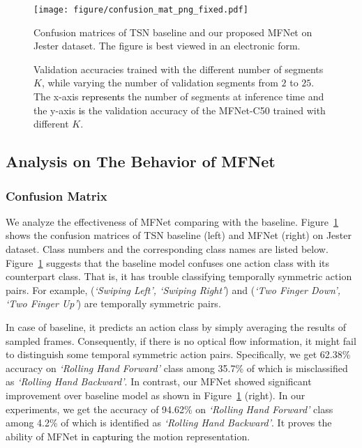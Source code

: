 \documentclass[runningheads]{llncs}
\newcommand{\nj}[1]{\textcolor{black}{#1}}
\begin{document}
\begin{figure}[t]
\centering
\texttt{[image: figure/confusion\_mat\_png\_fixed.pdf]}
\caption{Confusion matrices of TSN baseline and our proposed MFNet on Jester dataset. The figure is best viewed in an electronic form.} 
\label{confusion}
\end{figure}


\begin{figure}[tb]
\centering
\begin{minipage}[t]{0.45\linewidth}
    \label{f3}
\end{minipage}
\begin{minipage}[t]{0.45\linewidth}
    \label{f4}
\end{minipage}
\caption{Validation accuracies trained with the different number of segments $K$, while varying the number of validation segments from $2$ to $25$. The x-axis \nj{represents} the number of segments at inference time and the y-axis \nj{is} the validation accuracy of the MFNet-C50 trained with different $K$.}
\label{figure:varying_inference}
\end{figure}

\subsection{Analysis on The Behavior of MFNet}
\subsubsection{Confusion Matrix}
We analyze the effectiveness of MFNet comparing with the baseline. Figure~\ref{confusion} shows the confusion matrices of TSN baseline (left) and MFNet (right) on Jester dataset. Class numbers and the corresponding class names are listed below. Figure~\ref{confusion} suggests that the baseline model confuses one action class with its counterpart class. That is, it has trouble classifying temporally symmetric action pairs. For example, (\textit{`Swiping Left', `Swiping Right'}) and (\textit{`Two Finger Down', `Two Finger Up'}) are temporally symmetric pairs. 

In case of baseline, it predicts an action class by simply averaging the results of sampled frames. Consequently, if there is no optical flow information, it might fail to distinguish some temporal symmetric action pairs. Specifically, we get 62.38\% accuracy on \textit{`Rolling Hand Forward'} class among 35.7\% of which is misclassified as \textit{`Rolling Hand Backward'}. 
In contrast, our MFNet showed significant improvement over baseline model as shown in Figure~\ref{confusion} (right). In our experiments, we get the accuracy of 94.62\% on \textit{`Rolling Hand Forward'} class among 4.2\% of which is identified as \textit{`Rolling Hand Backward'}. It proves the ability of MFNet \nj{in capturing} the motion representation.
\end{document}
